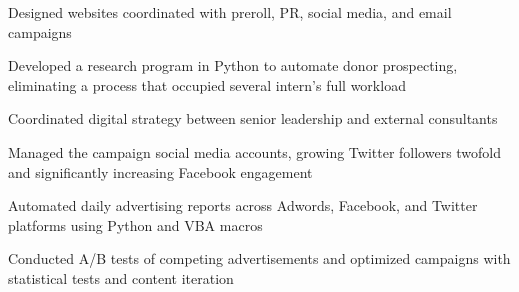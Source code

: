 \begin{listitems}
\item Designed websites coordinated with preroll, PR, social media, and email campaigns
\item Developed a research program in Python to automate donor prospecting, eliminating a process that occupied several intern's full workload
\item Coordinated digital strategy between senior leadership and external consultants
\item Managed the campaign social media accounts, growing Twitter followers twofold and significantly increasing Facebook engagement
\end{listitems}
\sectionsep

\begin{listitems}
\item Automated daily advertising reports across Adwords, Facebook, and Twitter platforms using Python and VBA macros
\item Conducted A/B tests of competing advertisements and optimized campaigns with statistical tests and content iteration
\end{listitems}
\sectionsep
